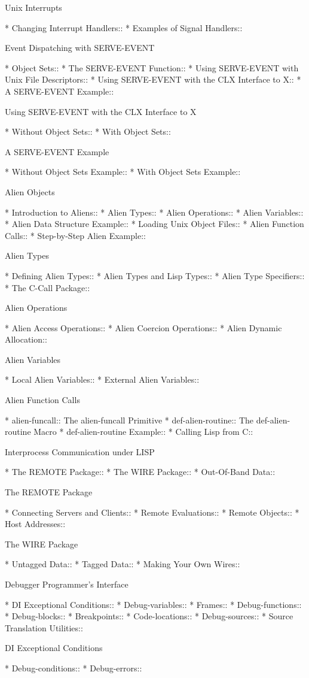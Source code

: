 \begin{menu}
Unix Interrupts

* Changing Interrupt Handlers::  
* Examples of Signal Handlers::  

Event Dispatching with SERVE-EVENT

* Object Sets::                 
* The SERVE-EVENT Function::    
* Using SERVE-EVENT with Unix File Descriptors::  
* Using SERVE-EVENT with the CLX Interface to X::  
* A SERVE-EVENT Example::       

Using SERVE-EVENT with the CLX Interface to X

* Without Object Sets::         
* With Object Sets::            

A SERVE-EVENT Example

* Without Object Sets Example::  
* With Object Sets Example::    

Alien Objects

* Introduction to Aliens::      
* Alien Types::                 
* Alien Operations::            
* Alien Variables::             
* Alien Data Structure Example::  
* Loading Unix Object Files::   
* Alien Function Calls::        
* Step-by-Step Alien Example::  

Alien Types

* Defining Alien Types::        
* Alien Types and Lisp Types::  
* Alien Type Specifiers::       
* The C-Call Package::          

Alien Operations

* Alien Access Operations::     
* Alien Coercion Operations::   
* Alien Dynamic Allocation::    

Alien Variables

* Local Alien Variables::       
* External Alien Variables::    

Alien Function Calls

* alien-funcall::               The alien-funcall Primitive
* def-alien-routine::           The def-alien-routine Macro
* def-alien-routine Example::   
* Calling Lisp from C::         

Interprocess Communication under LISP

* The REMOTE Package::          
* The WIRE Package::            
* Out-Of-Band Data::            

The REMOTE Package

* Connecting Servers and Clients::  
* Remote Evaluations::          
* Remote Objects::              
* Host Addresses::              

The WIRE Package

* Untagged Data::               
* Tagged Data::                 
* Making Your Own Wires::       

Debugger Programmer's Interface

* DI Exceptional Conditions::   
* Debug-variables::             
* Frames::                      
* Debug-functions::             
* Debug-blocks::                
* Breakpoints::                 
* Code-locations::              
* Debug-sources::               
* Source Translation Utilities::  

DI Exceptional Conditions

* Debug-conditions::            
* Debug-errors::                
\end{menu}

